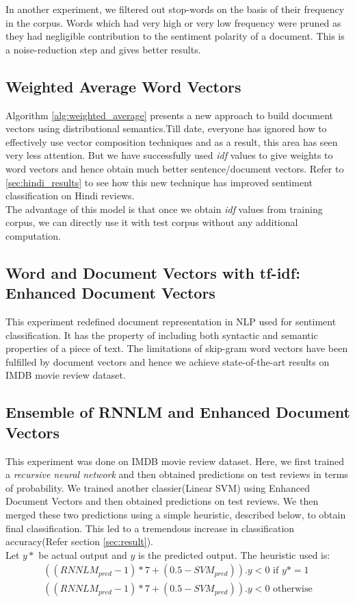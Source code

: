\documentclass[11pt,a4paper]{article}
\begin{document}
In another experiment, we filtered out stop-words on the basis of their frequency in the corpus. Words which had very high or very low frequency were pruned as they had negligible contribution to the sentiment polarity of a document. This is a noise-reduction step and gives better results.

\subsection{Weighted Average Word Vectors}
Algorithm \ref{alg:weighted_average} presents a new approach to build document vectors using distributional semantics.Till date, everyone has ignored how to effectively use vector composition techniques and as a result, this area has seen very less attention. But we have successfully used \emph{idf} values to give weights to word vectors and hence obtain much better sentence/document vectors. Refer to \ref{sec:hindi_results} to see how this new technique has improved sentiment classification on Hindi reviews.\\

The advantage of this model is that once we obtain \emph{idf} values from training corpus, we can directly use it with test corpus without any additional computation.

\subsection{Word and Document Vectors with tf-idf: Enhanced Document Vectors}
This experiment redefined document representation in NLP used for sentiment classification. It has the property of including both syntactic and semantic properties of a piece of text. The limitations of skip-gram word vectors have been fulfilled by document vectors and hence we achieve state-of-the-art results on IMDB movie review dataset.

\subsection{Ensemble of RNNLM and Enhanced Document Vectors}
This experiment was done on IMDB movie review dataset. Here, we first trained a \emph{recursive neural network} and then obtained predictions on test reviews in terms of probability. We trained another classier(Linear SVM) using Enhanced Document Vectors and then obtained predictions on test reviews. We then merged these two predictions using a simple heuristic, described below, to obtain final classification. This led to a tremendous increase in classification accuracy(Refer section \ref{sec:result}).\\
Let $y*$ be actual output and $y$ is the predicted output. The heuristic used is:
\begin{align}
((RNNLM_{pred}-1)*7+(0.5-SVM_{pred})).y<0 \text{  if } y*=1\\
((RNNLM_{pred}-1)*7+(0.5-SVM_{pred})).y<0 \text{  otherwise}
\end{align}
\end{document}
